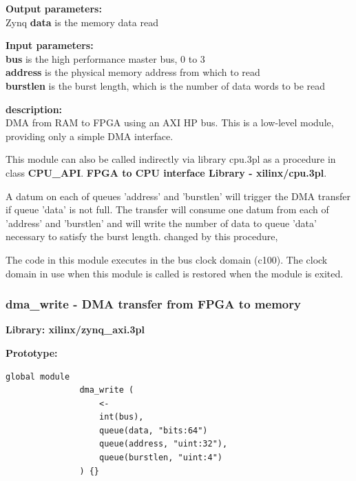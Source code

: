             {\bf Output parameters:} \\Zynq
            {\bf data} is the memory data read

            {\bf Input parameters:} \\            
            {\bf bus} is the high performance master bus, 0 to 3 \\  
            {\bf address} is the physical memory address from which to read \\  
            {\bf burstlen} is the burst length, which is the number of data
            words to be read

            {\bf description:} \\            
            DMA from RAM to FPGA using an AXI HP bus.
            This is a low-level module, providing only a simple DMA interface.
            
            This module can also be called indirectly via library cpu.3pl
            as a procedure in class {\bf CPU\_API}.
             {\bf FPGA to CPU interface Library
            - xilinx/cpu.3pl}.
            
            A datum on each of queues 'address' and 'burstlen' will trigger the
            DMA transfer if queue 'data' is not full. The transfer will consume
            one datum from each of 'address' and 'burstlen' and will write the
            number of data to queue 'data' necessary to satisfy the burst length.
            changed by this procedure,

            The code in this module executes in the bus clock domain (c100).
            The clock domain in use when this module is called is restored when
            the module is exited.



    
        \subsubsection{dma\_write - DMA transfer from FPGA to memory}\label{sec:lmzynqwrdma}

            {\bf Library: xilinx/zynq\_axi.3pl}


            {\bf Prototype:} \\
            \vsp
            \begin{lstlisting}[gobble=12, language=threepl]
               global module
               dma_write (
                   <-
                   int(bus),
                   queue(data, "bits:64")
                   queue(address, "uint:32"),
                   queue(burstlen, "uint:4")
               ) {}
            \end{lstlisting}

